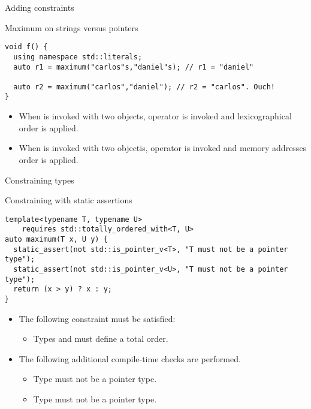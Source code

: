 \begin{frame}[t,fragile]{Adding constraints}

\begin{block}{Maximum on strings versus pointers}
\begin{lstlisting}
void f() {
  using namespace std::literals;
  auto r1 = maximum("carlos"s,"daniel"s); // r1 = "daniel"

  auto r2 = maximum("carlos","daniel"); // r2 = "carlos". Ouch!
}  
\end{lstlisting}
\end{block}

\begin{itemize}
  \item When  is invoked with two  objects,
        operator \cppkey{<} is invoked and lexicographical order is applied.

  \item When  is invoked with two  objectis,
        operator \cppkey{<} is invoked and memory addresses order is applied.
\end{itemize}

\end{frame}


\begin{frame}[t,fragile]{Constraining types}
\begin{block}{Constraining with static assertions}
\begin{lstlisting}
template<typename T, typename U>
    requires std::totally_ordered_with<T, U>
auto maximum(T x, U y) {
  static_assert(not std::is_pointer_v<T>, "T must not be a pointer type");
  static_assert(not std::is_pointer_v<U>, "T must not be a pointer type");
  return (x > y) ? x : y;
}
\end{lstlisting}
\end{block}

\begin{itemize}
  \item The following constraint must be satisfied:
    \begin{itemize}
      \item Types  and  must define a total order.
    \end{itemize}
  \item The following additional compile-time checks are performed.
    \begin{itemize}
      \item Type  must not be a pointer type.
      \item Type  must not be a pointer type.
    \end{itemize}
\end{itemize}
\end{frame}

